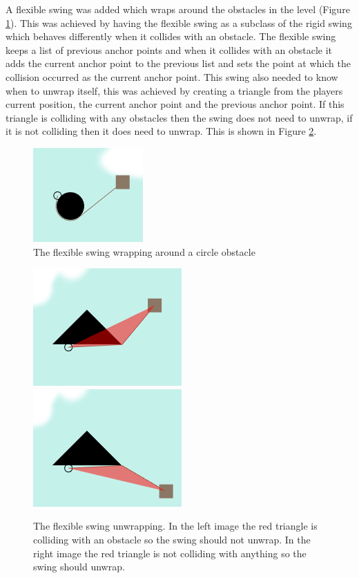\documentclass[]{report}
\begin{document}
			A flexible swing was added which wraps around the obstacles in the level (Figure \ref{swingWrap}). This was achieved by having the flexible swing as a subclass of the rigid swing which behaves differently when it collides with an obstacle. The flexible swing keeps a list of previous anchor points and when it collides with an obstacle it adds the current anchor point to the previous list and sets the point at which the collision occurred as the current anchor point. This swing also needed to know when to unwrap itself, this was achieved by creating a triangle from the players current position, the current anchor point and the previous anchor point. If this triangle is colliding with any obstacles then the swing does not need to unwrap, if it is not colliding then it does need to unwrap. This is shown in Figure \ref{swingUnwrap}.
			
			\begin{figure}[H]
				\centering
				\includegraphics{swingWrap}
				\caption{The flexible swing wrapping around a circle obstacle}
				\label{swingWrap}
			\end{figure}
			
			\begin{figure}[H]
				\centering
				\includegraphics[scale=0.6]{swingUnwrapNo}
				\includegraphics[scale=0.6]{swingUnwrapYes}
				\caption{The flexible swing unwrapping. In the left image the red triangle is colliding with an obstacle so the swing should not unwrap. In the right image the red triangle is not colliding with anything so the swing should unwrap.}
				\label{swingUnwrap}
			\end{figure}
			
\end{document}

